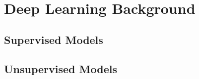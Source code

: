 \section{Deep Learning Background}

\subsection{Supervised Models}

\subsection{Unsupervised Models}


